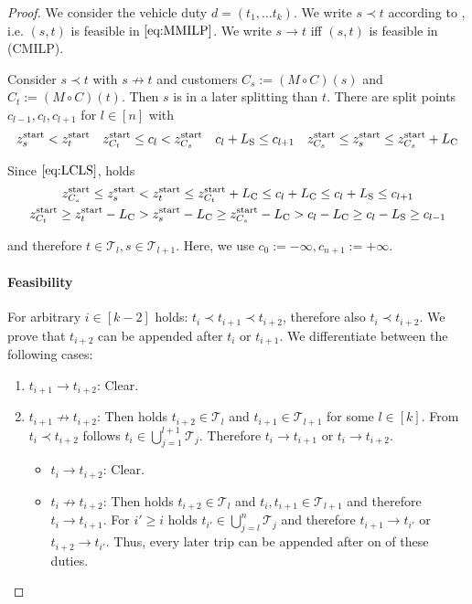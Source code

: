 \begin{proof}

We consider the vehicle duty $d=\left(t_1,\dots t_k\right)$. We write $s\prec t$ according to , i.e. $(s,t)$ is feasible in $\eqref{eq:MMILP}$. We write $s\to t$ iff $(s,t)$ is feasible in (CMILP).

Consider $s\prec t$ with $s\not\to t$ and customers $C_s:=(M\circ C)(s)$ and $C_t:=(M\circ C)(t)$. Then $s$ is in a later splitting than $t$. There are split points $c_{l-1},c_l,c_{l+1}$ for $l\in[n]$ with
\begin{align*}
	z^{\operatorname{start}}_s < z^{\operatorname{start}}_t && z^{\operatorname{start}}_{C_t}\leq c_l <z^{\operatorname{start}}_{C_s} && c_l+L_{\operatorname{S}}\leq c_{l+1} && z^{\operatorname{start}}_{C_s}\leq z^{\operatorname{start}}_s\leq z^{\operatorname{start}}_{C_s}+L_{\operatorname{C}}
\end{align*}

Since $\eqref{eq:LCLS}$, holds
\begin{gather*}
	z^{\operatorname{start}}_{C_s} \leq z^{\operatorname{start}}_s < z^{\operatorname{start}}_t\leq z^{\operatorname{start}}_{C_t}+L_{\operatorname{C}} \leq c_l+L_{\operatorname{C}} \leq c_l+L_{\operatorname{S}} \leq c_{l+1} \\
	z^{\operatorname{start}}_{C_t} \geq z^{\operatorname{start}}_t-L_{\operatorname{C}} > z^{\operatorname{start}}_s-L_{\operatorname{C}} \geq z^{\operatorname{start}}_{C_s}-L_{\operatorname{C}} > c_l-L_{\operatorname{C}}\geq c_l-L_{\operatorname{S}}\geq c_{l-1}
\end{gather*}

and therefore $t\in\mathcal{T}_l,s\in\mathcal{T}_{l+1}$. Here, we use $c_{0}:=-\infty,c_{n+1}:=+\infty$.

\paragraph{Feasibility} \proofparfill

For arbitrary $i\in[k-2]$ holds: $t_i\prec t_{i+1}\prec t_{i+2}$, therefore also $t_i\prec t_{i+2}$. We prove that $t_{i+2}$ can be appended after $t_{i}$ or $t_{i+1}$. We differentiate between the following cases:
\begin{enumerate}
	\item{$t_{i+1}\to t_{i+2}$:}
		Clear.
	\item{$t_{i+1}\not\to t_{i+2}$:}
		Then holds $t_{i+2}\in\mathcal{T}_l$ and $t_{i+1}\in\mathcal{T}_{l+1}$ for some $l\in[k]$. From $t_i\prec t_{i+2}$ follows $t_i\in\bigcup_{j=1}^{l+1}\mathcal{T}_j$. Therefore $t_i\to t_{i+1}$ or $t_i\to t_{i+2}$.
	\begin{itemize}
		\item{$t_i\to t_{i+2}$:}
			Clear.
		\item{$t_i\not\to t_{i+2}$:}
			Then holds $t_{i+2}\in\mathcal{T}_l$ and $t_i,t_{i+1}\in\mathcal{T}_{l+1}$ and therefore $t_i\to t_{i+1}$. For $i'\geq i$ holds $t_{i'}\in\bigcup_{j=l}^n \mathcal{T}_j$ and therefore $t_{i+1}\to t_{i'}$ or $t_{i+2}\to t_{i'}$. Thus, every later trip can be appended after on of these duties.
	\end{itemize}
\end{enumerate}


\end{proof}
